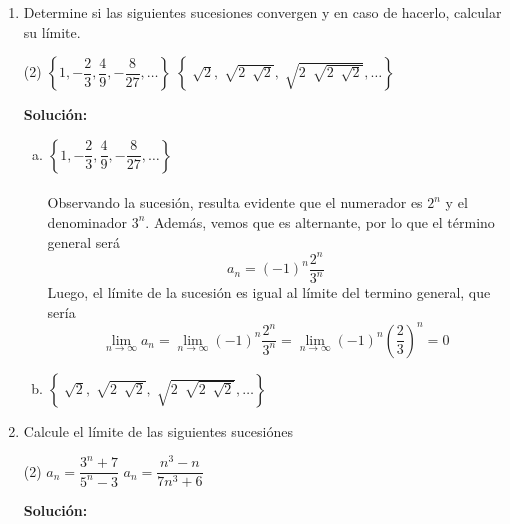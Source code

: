 \documentclass[12pt]{article}
\newenvironment{solucion}
{\begin{mdframed}[backgroundcolor=black!10]
		{\bf Solución:}\\
	}
	{
	\end{mdframed}
}
\newenvironment{preguntas}
{\begin{enumerate}\itemsep12pt
	}
	{
	\end{enumerate}
}
\newcommand{\ra}{\rightarrow}
\begin{document}
\begin{preguntas}
\item Determine si las siguientes sucesiones convergen y en caso de hacerlo, calcular su límite.
\begin{tasks}(2)
\task $\left\{1, -\dfrac{2}{3}, \dfrac{4}{9}, -\dfrac{8}{27}, \dots \right\}$
\task $\left\{\sqrt[]{2}, \sqrt[]{2\ \sqrt[]{2}}, \sqrt[]{2\ \sqrt[]{2\ \sqrt[]{2}}}, \dots \right\}$
\end{tasks}
\begin{solucion}

\begin{enumerate}[a)]
\item $\left\{1, -\dfrac{2}{3}, \dfrac{4}{9}, -\dfrac{8}{27}, \dots \right\}$\\
			\\
			Observando la sucesión, resulta evidente que el numerador es $2^n$ y el\\ denominador $3^n$. Además, vemos que es alternante, por lo que el término general será
			$$a_n = (-1)^n \dfrac{2^{n}}{3^{n}}$$
			Luego, el límite de la sucesión es igual al límite del termino general, que sería
			$$\lim\limits_{n\ra \infty} a_n = \lim\limits_{n\ra \infty} (-1)^n \dfrac{2^{n}}{3^{n}} = 
			\lim\limits_{n\ra \infty} (-1)^n \left(\dfrac{2}{3}\right)^n = 0$$
\item $\left\{\sqrt[]{2}, \sqrt[]{2\ \sqrt[]{2}}, \sqrt[]{2\ \sqrt[]{2\ \sqrt[]{2}}}, \dots \right\}$
\end{enumerate}
\end{solucion}
\item Calcule el límite de las siguientes sucesiónes
\begin{tasks}(2)
\task $a_n = \dfrac{3^n+7}{5^n-3}$
\task $a_n = \dfrac{n^3-n}{7n^3+6}$
\end{tasks}
\begin{solucion}


\end{solucion}
\end{preguntas}
\end{document}
